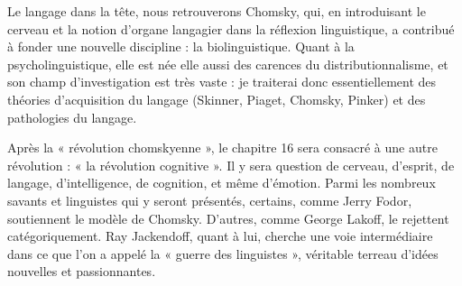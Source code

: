 Le langage dans la tête, nous retrouverons Chomsky, qui, en introduisant le cerveau et la notion d’organe langagier dans la réflexion linguistique, a contribué à fonder une nouvelle discipline : la biolinguistique. Quant à la psycholinguistique, elle est née elle aussi des carences du distributionnalisme, et son champ d’investigation est très vaste : je traiterai donc essentiellement des théories d’acquisition du langage (Skinner, Piaget, Chomsky, Pinker) et des pathologies du langage.

Après la « révolution chomskyenne », le chapitre 16 sera consacré à une autre révolution : « la révolution cognitive ». Il y sera question de cerveau, d’esprit, de langage, d’intelligence, de cognition, et même d’émotion. Parmi les nombreux savants et linguistes qui y seront présentés, certains, comme Jerry Fodor, soutiennent le modèle de Chomsky. D’autres, comme George Lakoff, le rejettent catégoriquement. Ray Jackendoff, quant à lui, cherche une voie intermédiaire dans ce que l’on a appelé la « guerre des linguistes », véritable terreau d’idées nouvelles et passionnantes.
